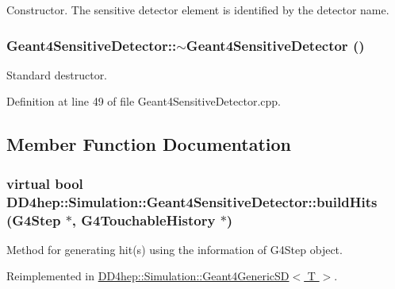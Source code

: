 Constructor. The sensitive detector element is identified by the detector name. \hypertarget{class_d_d4hep_1_1_simulation_1_1_geant4_sensitive_detector_a15bd6477c7c266c3478c59ac34b2fe31}{
\subsubsection[{$\sim$Geant4SensitiveDetector}]{\setlength{\rightskip}{0pt plus 5cm}Geant4SensitiveDetector::$\sim$Geant4SensitiveDetector ()}}
\label{class_d_d4hep_1_1_simulation_1_1_geant4_sensitive_detector_a15bd6477c7c266c3478c59ac34b2fe31}


Standard destructor. 

Definition at line 49 of file Geant4SensitiveDetector.cpp.

\subsection{Member Function Documentation}
\hypertarget{class_d_d4hep_1_1_simulation_1_1_geant4_sensitive_detector_a96d4594c8e1af23ef5c572938460670e}{
\subsubsection[{buildHits}]{\setlength{\rightskip}{0pt plus 5cm}virtual bool DD4hep::Simulation::Geant4SensitiveDetector::buildHits (G4Step $\ast$, \/  G4TouchableHistory $\ast$)}}
\label{class_d_d4hep_1_1_simulation_1_1_geant4_sensitive_detector_a96d4594c8e1af23ef5c572938460670e}


Method for generating hit(s) using the information of G4Step object. 

Reimplemented in \hyperlink{class_d_d4hep_1_1_simulation_1_1_geant4_generic_s_d_a72d6c9cb683b9a0bd58fdbd17dc94be6}{DD4hep::Simulation::Geant4GenericSD$<$ T $>$}.

